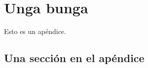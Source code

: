 \chapter{Unga bunga}

\noindent Esto es un apéndice.

\section{Una sección en el apéndice}

\noindent \lipsum
